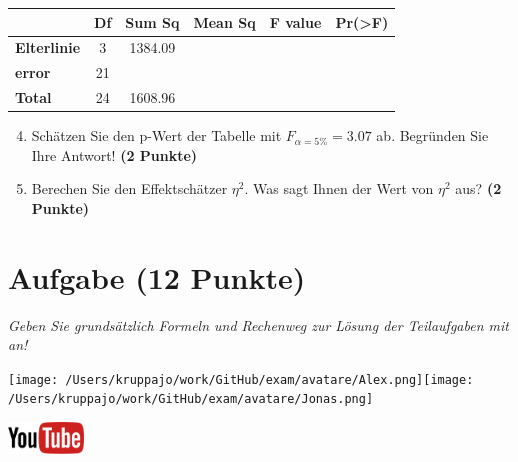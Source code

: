 \documentclass[a4paper, 9pt]{scrartcl}\usepackage[]{graphicx}\usepackage[]{xcolor}
\begin{document}
\vspace{1Ex}

\begin{center}
  \Large
  \begin{tabular}{lccccp{3cm}}
\toprule
     & \textbf{Df} & \textbf{Sum Sq} & \textbf{Mean Sq} & \textbf{F value} & \textbf{Pr(>F)} \strut\\
    \midrule
   \textbf{Elterlinie}  & 3 & 1384.09 &  &  &  \strut\\
   \textbf{error}  & 21 &  &  &  &  \strut\\
   \textbf{Total}  & 24 & 1608.96 &  &  &  \strut\\
\bottomrule
  \end{tabular}
\end{center}

\vspace{1Ex}

\begin{enumerate}
  \setcounter{enumi}{3}
\item Schätzen Sie den p-Wert der Tabelle mit $F_{\alpha = 5\%} = 3.07$ ab. Begründen Sie Ihre Antwort! \textbf{(2 Punkte)}
\item Berechen Sie den Effektschätzer $\eta^2$. Was sagt Ihnen der Wert von $\eta^2$ aus? \textbf{(2 Punkte)}
\end{enumerate}



 
\clearpage

\section{Aufgabe \hfill (12 Punkte)}

\textit{Geben Sie grundsätzlich Formeln und Rechenweg zur Lösung der Teilaufgaben mit an!} \\[1Ex]
 

 
\begin{minipage}[t]{0.5\textwidth}
\texttt{[image: /Users/kruppajo/work/GitHub/exam/avatare/Alex.png]}\hspace{-4mm}\texttt{[image: /Users/kruppajo/work/GitHub/exam/avatare/Jonas.png]}
\end{minipage}
\begin{minipage}[t]{0.5\textwidth}
\hfill
\href{https://youtu.be/49hvImMwVyE}{\includegraphics[width = 2cm]{img/youtube}}
\end{minipage}
\vspace{1ex}
\end{document}
